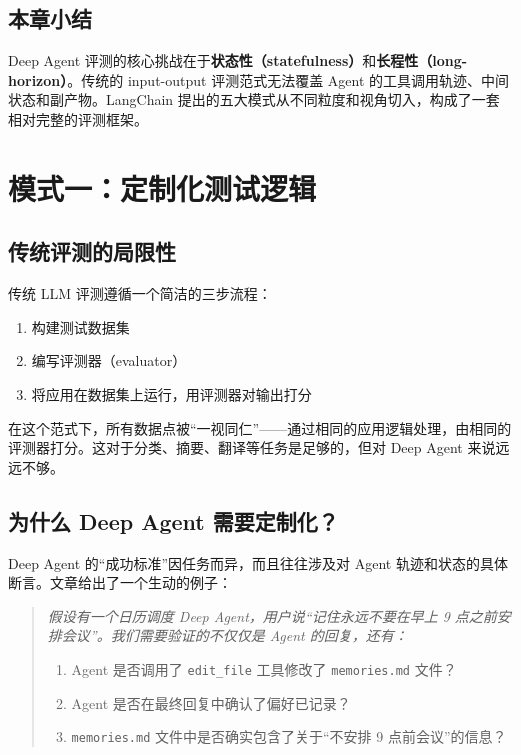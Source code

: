\documentclass[a4paper]{article}
\begin{document}
\subsection{本章小结}

Deep Agent 评测的核心挑战在于\textbf{状态性（statefulness）}和\textbf{长程性（long-horizon）}。传统的 input-output 评测范式无法覆盖 Agent 的工具调用轨迹、中间状态和副产物。LangChain 提出的五大模式从不同粒度和视角切入，构成了一套相对完整的评测框架。


\section{模式一：定制化测试逻辑}

\subsection{传统评测的局限性}

传统 LLM 评测遵循一个简洁的三步流程：

\begin{enumerate}
  \item 构建测试数据集
  \item 编写评测器（evaluator）
  \item 将应用在数据集上运行，用评测器对输出打分
\end{enumerate}

在这个范式下，所有数据点被``一视同仁''——通过相同的应用逻辑处理，由相同的评测器打分。这对于分类、摘要、翻译等任务是足够的，但对 Deep Agent 来说远远不够。

\subsection{为什么 Deep Agent 需要定制化？}

Deep Agent 的``成功标准''因任务而异，而且往往涉及对 Agent 轨迹和状态的具体断言。文章给出了一个生动的例子：

\begin{quote}
\textit{假设有一个日历调度 Deep Agent，用户说``记住永远不要在早上 9 点之前安排会议''。我们需要验证的不仅仅是 Agent 的回复，还有：}
\begin{enumerate}
  \item Agent 是否调用了 \texttt{edit\_file} 工具修改了 \texttt{memories.md} 文件？
  \item Agent 是否在最终回复中确认了偏好已记录？
  \item \texttt{memories.md} 文件中是否确实包含了关于``不安排 9 点前会议''的信息？
\end{enumerate}
\end{quote}
\end{document}
